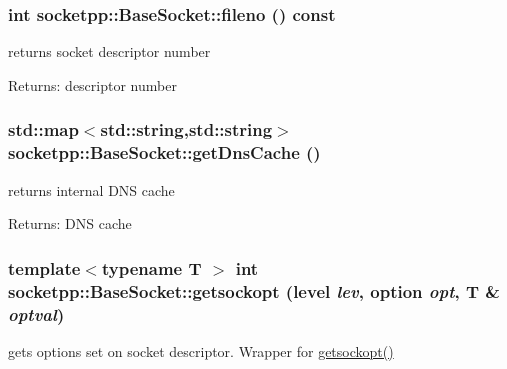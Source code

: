 \begin{CompactItemize}
{\subsubsection[{fileno}]{\setlength{\rightskip}{0pt plus 5cm}int socketpp::BaseSocket::fileno () const}}
\label{classsocketpp_1_1BaseSocket_c96db07cc917926d895d89cf73734ea1}


returns socket descriptor number 

\begin{Desc}
\item[Returns:]descriptor number \end{Desc}
\hypertarget{classsocketpp_1_1BaseSocket_52bf8df48bf4da48eff4adc690caa211}{
\subsubsection[{getDnsCache}]{\setlength{\rightskip}{0pt plus 5cm}std::map$<$std::string,std::string$>$ socketpp::BaseSocket::getDnsCache ()}}
\label{classsocketpp_1_1BaseSocket_52bf8df48bf4da48eff4adc690caa211}


returns internal DNS cache 

\begin{Desc}
\item[Returns:]DNS cache \end{Desc}
\hypertarget{classsocketpp_1_1BaseSocket_c845c3a037f0f400fd50dfb58706b6e4}{
\subsubsection[{getsockopt}]{\setlength{\rightskip}{0pt plus 5cm}template$<$typename T $>$ int socketpp::BaseSocket::getsockopt ({\bf level} {\em lev}, \/  {\bf option} {\em opt}, \/  T \& {\em optval})}}
\label{classsocketpp_1_1BaseSocket_c845c3a037f0f400fd50dfb58706b6e4}


gets options set on socket descriptor. Wrapper for \hyperlink{classsocketpp_1_1BaseSocket_c845c3a037f0f400fd50dfb58706b6e4}{getsockopt()} 


\end{CompactItemize}
